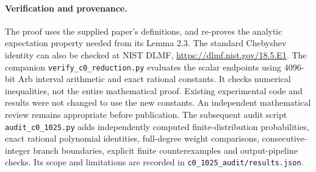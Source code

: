 \documentclass[11pt]{article}
\begin{document}
\paragraph{Verification and provenance.}
The proof uses the supplied paper's definitions, and re-proves the analytic
expectation property needed from its Lemma 2.3. The standard Chebyshev
identity can also be checked at NIST DLMF,
\url{https://dlmf.nist.gov/18.5.E1}. The companion
\texttt{verify\_c0\_reduction.py} evaluates the scalar endpoints using
4096-bit Arb interval arithmetic and exact rational constants. It checks
numerical inequalities, not the entire mathematical proof. Existing
experimental code and results were not changed to use the new constants.
An independent mathematical review remains appropriate before publication.
The subsequent audit script \texttt{audit\_c0\_1025.py} adds independently
computed finite-distribution probabilities, exact rational polynomial
identities, full-degree weight comparisons, consecutive-integer branch
boundaries, explicit finite counterexamples and output-pipeline checks.
Its scope and limitations are recorded in \texttt{c0\_1025\_audit/results.json}.
\end{document}

